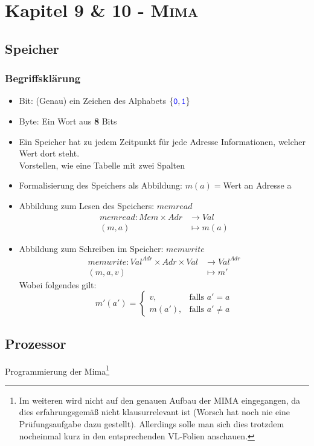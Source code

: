 \documentclass{article}
\newcommand{\kapitel}[2]{Kapitel #1 - \textsc{#2}}
\newcommand{\blue}[1]{\textcolor{blue}{#1}}
\newcommand{\important}[1]{\textcolor{importantColor}{#1}}
\newcommand{\word}[1]{\blue{\texttt{#1}}}
\newcommand{\set}[1]{\{#1\}}
\newcommand{\anfuehrung}[1]{\flqq #1\frqq}
\begin{document}
\newpage
\section{\kapitel{9 \& 10}{Mima}}
\subsection{Speicher}
\subsubsection{Begriffsklärung}
\begin{itemize}
    \item \important{Bit}: (Genau) ein Zeichen des Alphabets $\set{\word{0},\word{1}}$
    \item \important{Byte}: Ein Wort aus \textbf{8} Bits
    \item Ein Speicher hat zu jedem Zeitpunkt für jede \important{Adresse} Informationen, welcher \important{Wert} dort steht.\\
    Vorstellen, wie eine Tabelle mit zwei Spalten
    \item Formalisierung des Speichers als Abbildung: $m(a)=$\anfuehrung{Wert an Adresse a}
    \item Abbildung zum Lesen des Speichers: $memread$
    \begin{align*}
        memread: Mem\times Adr&\to Val\\
        (m,a)&\mapsto m(a)
    \end{align*}
    \item Abbildung zum Schreiben im Speicher: $memwrite$
    \begin{align*}
        memwrite: Val^{Adr}\times Adr\times Val&\to Val^{Adr}\\
        (m,a, v)&\mapsto m'
    \end{align*}
    Wobei folgendes gilt:\\
    \[m'(a')=
    \begin{cases}
        v, &\text{falls } a'=a\\
        m(a'), &\text{falls } a'\not=a
    \end{cases}\]
\end{itemize}

\subsection{Prozessor}
Programmierung der Mima\footnote{Im weiteren wird nicht auf den genauen Aufbau der MIMA eingegangen, da dies erfahrungsgemäß nicht klausurrelevant ist (Worsch hat noch nie eine Prüfungsaufgabe dazu gestellt). Allerdings solle man sich dies trotzdem nocheinmal kurz in den entsprechenden VL-Folien anschauen.}
\end{document}
